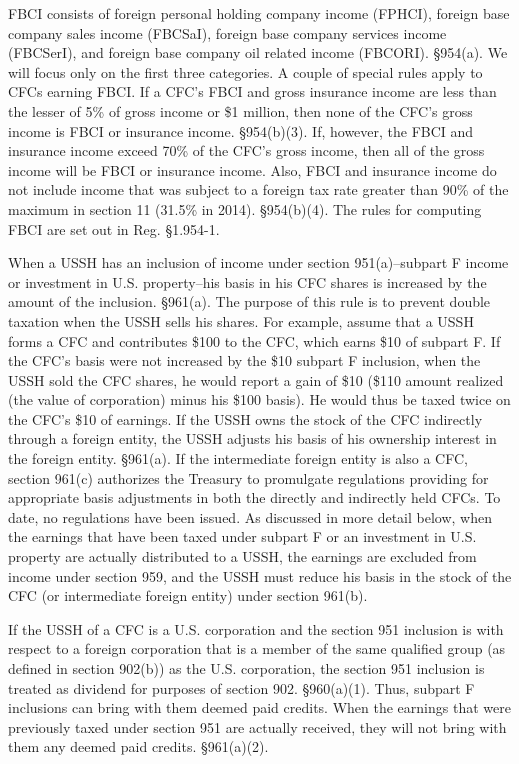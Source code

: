FBCI consists of foreign personal holding company income (FPHCI), foreign base company sales income (FBCSaI), foreign base company services income (FBCSerI), and foreign base company oil related income (FBCORI).  \S 954(a).  We will focus only on the first three categories.  A couple of special rules apply to CFCs earning  FBCI.  If a CFC's FBCI and gross insurance income are less than the lesser of 5\% of gross income or \$1 million, then none of the CFC's gross income is FBCI or insurance income.  \S 954(b)(3).  If, however, the FBCI and insurance income exceed 70\% of the CFC's gross income, then all of the gross income will be FBCI or insurance income.  Also, FBCI and insurance income do not include income that was subject to a foreign tax rate greater than 90\% of the maximum in section 11 (31.5\% in 2014).  \S 954(b)(4).  The rules for computing FBCI are set out in Reg. \S 1.954-1.    
		  
When a USSH has an inclusion of income under section 951(a)--subpart F income or investment in U.S. property--his basis in his CFC shares is increased by the amount of the inclusion.  \S 961(a).  The purpose of this rule is to prevent double taxation when the USSH sells his shares.  For example, assume that a USSH forms a CFC and contributes \$100 to the CFC, which earns \$10 of subpart F.  If the CFC's basis were not increased by the \$10 subpart F inclusion, when the USSH sold the CFC shares, he would report a gain of \$10 (\$110 amount realized (the value of corporation) minus his \$100 basis).  He would thus be taxed twice on the CFC's \$10 of earnings.  If the USSH owns the stock of the CFC indirectly through a foreign entity, the USSH adjusts his basis of his ownership interest in the foreign entity.  \S 961(a).  If the intermediate foreign entity is also a CFC, section 961(c) authorizes the Treasury to promulgate regulations providing for appropriate basis adjustments in both the directly and indirectly held CFCs.  To date, no regulations have been issued.  As discussed in more detail below, when the earnings that have been taxed under subpart F or an investment in U.S. property are actually distributed to a USSH, the earnings are excluded from income under section 959, and the USSH must reduce his basis in the stock of the CFC (or intermediate foreign entity) under section 961(b).   
		  
If the USSH of a CFC is a U.S. corporation and the section 951 inclusion is with respect to a foreign corporation that is a member of the same qualified group (as defined in section 902(b)) as the U.S. corporation, the section 951 inclusion is treated as dividend for purposes of section 902.  \S 960(a)(1).  Thus, subpart F inclusions can bring with them deemed paid credits.  When the earnings that were previously taxed under section 951 are actually received, they will not bring with them any deemed paid credits.  \S 961(a)(2).
		
